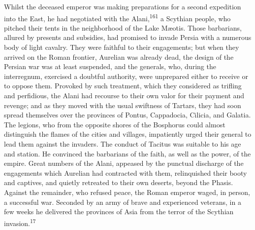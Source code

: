 
Whilst the deceased emperor was making preparations for a second
expedition into the East, he had negotiated with the Alani,\textsuperscript{161} a
Scythian people, who pitched their tents in the neighborhood of
the Lake Mæotis. Those barbarians, allured by presents and
subsidies, had promised to invade Persia with a numerous body of
light cavalry. They were faithful to their engagements; but when
they arrived on the Roman frontier, Aurelian was already dead,
the design of the Persian war was at least suspended, and the
generals, who, during the interregnum, exercised a doubtful
authority, were unprepared either to receive or to oppose them.
Provoked by such treatment, which they considered as trifling and
perfidious, the Alani had recourse to their own valor for their
payment and revenge; and as they moved with the usual swiftness
of Tartars, they had soon spread themselves over the provinces of
Pontus, Cappadocia, Cilicia, and Galatia. The legions, who from
the opposite shores of the Bosphorus could almost distinguish the
flames of the cities and villages, impatiently urged their
general to lead them against the invaders. The conduct of Tacitus
was suitable to his age and station. He convinced the barbarians
of the faith, as well as the power, of the empire. Great numbers
of the Alani, appeased by the punctual discharge of the
engagements which Aurelian had contracted with them, relinquished
their booty and captives, and quietly retreated to their own
deserts, beyond the Phasis. Against the remainder, who refused
peace, the Roman emperor waged, in person, a successful war.
Seconded by an army of brave and experienced veterans, in a few
weeks he delivered the provinces of Asia from the terror of the
Scythian invasion.\textsuperscript{17}



